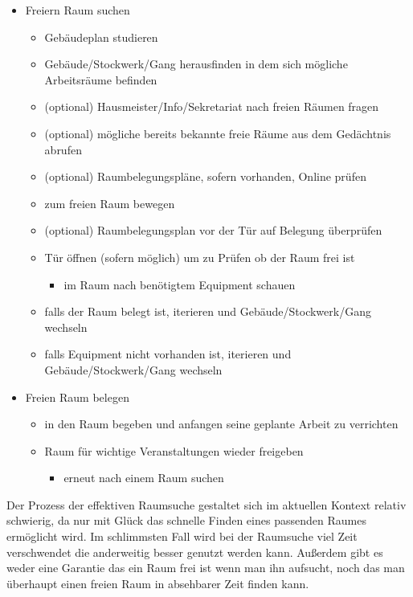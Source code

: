 \begin{itemize}
	\item Freiern Raum suchen
	\begin{itemize}
		\item Gebäudeplan studieren
		\item Gebäude/Stockwerk/Gang herausfinden in dem sich mögliche Arbeitsräume befinden
		\item (optional) Hausmeister/Info/Sekretariat nach freien Räumen fragen
		\item (optional) mögliche bereits bekannte freie Räume aus dem Gedächtnis abrufen
		\item (optional) Raumbelegungspläne, sofern vorhanden, Online prüfen
		\item zum freien Raum bewegen
		\item (optional) Raumbelegungsplan vor der Tür auf Belegung überprüfen
		\item Tür öffnen (sofern möglich) um zu Prüfen ob der Raum frei ist
			\begin{itemize}
				\item im Raum nach benötigtem Equipment schauen
			\end{itemize}
		\item falls der Raum belegt ist, iterieren und \ggfs Gebäude/Stockwerk/Gang wechseln
		\item falls Equipment nicht vorhanden ist, iterieren und \ggfs Gebäude/Stockwerk/Gang wechseln
	\end{itemize}
	\item Freien Raum belegen
	\begin{itemize}
		\item in den Raum begeben und anfangen seine geplante Arbeit zu verrichten
		\item \ggfs Raum für wichtige Veranstaltungen wieder freigeben
		\begin{itemize}
			\item erneut nach einem Raum suchen
		\end{itemize}
	\end{itemize}
\end{itemize}

Der Prozess der effektiven Raumsuche gestaltet sich im aktuellen Kontext
relativ schwierig, da nur mit Glück das schnelle Finden eines passenden Raumes
ermöglicht wird. Im schlimmsten Fall wird bei der Raumsuche viel Zeit
verschwendet die anderweitig besser genutzt werden kann. Außerdem gibt es
weder eine Garantie das ein Raum frei ist wenn man ihn aufsucht, noch das man
überhaupt einen freien Raum in absehbarer Zeit finden kann.

